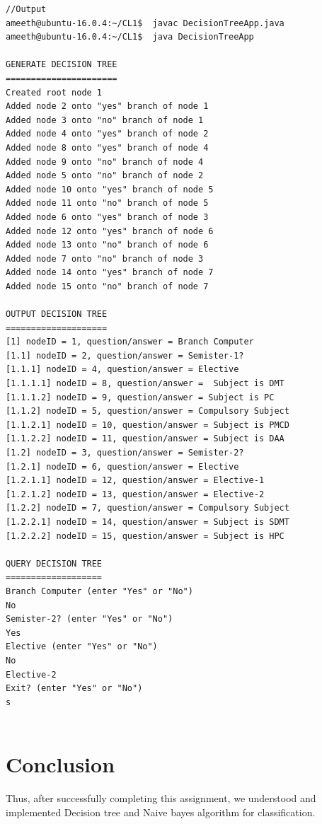 \documentclass[12pt]{article}
\begin{document}
\begin{verbatim}
//Output
ameeth@ubuntu-16.0.4:~/CL1$  javac DecisionTreeApp.java 
ameeth@ubuntu-16.0.4:~/CL1$  java DecisionTreeApp 

GENERATE DECISION TREE
======================
Created root node 1
Added node 2 onto "yes" branch of node 1
Added node 3 onto "no" branch of node 1
Added node 4 onto "yes" branch of node 2
Added node 8 onto "yes" branch of node 4
Added node 9 onto "no" branch of node 4
Added node 5 onto "no" branch of node 2
Added node 10 onto "yes" branch of node 5
Added node 11 onto "no" branch of node 5
Added node 6 onto "yes" branch of node 3
Added node 12 onto "yes" branch of node 6
Added node 13 onto "no" branch of node 6
Added node 7 onto "no" branch of node 3
Added node 14 onto "yes" branch of node 7
Added node 15 onto "no" branch of node 7

OUTPUT DECISION TREE
====================
[1] nodeID = 1, question/answer = Branch Computer
[1.1] nodeID = 2, question/answer = Semister-1?
[1.1.1] nodeID = 4, question/answer = Elective
[1.1.1.1] nodeID = 8, question/answer =  Subject is DMT
[1.1.1.2] nodeID = 9, question/answer = Subject is PC
[1.1.2] nodeID = 5, question/answer = Compulsory Subject
[1.1.2.1] nodeID = 10, question/answer = Subject is PMCD
[1.1.2.2] nodeID = 11, question/answer = Subject is DAA
[1.2] nodeID = 3, question/answer = Semister-2?
[1.2.1] nodeID = 6, question/answer = Elective
[1.2.1.1] nodeID = 12, question/answer = Elective-1
[1.2.1.2] nodeID = 13, question/answer = Elective-2
[1.2.2] nodeID = 7, question/answer = Compulsory Subject
[1.2.2.1] nodeID = 14, question/answer = Subject is SDMT
[1.2.2.2] nodeID = 15, question/answer = Subject is HPC

QUERY DECISION TREE
===================
Branch Computer (enter "Yes" or "No")
No 
Semister-2? (enter "Yes" or "No")
Yes
Elective (enter "Yes" or "No")
No
Elective-2
Exit? (enter "Yes" or "No")
s


\end{verbatim}

\section{Conclusion}
Thus, after successfully completing this assignment, we understood and implemented Decision tree and Naive bayes algorithm for classification.
\end{document}
